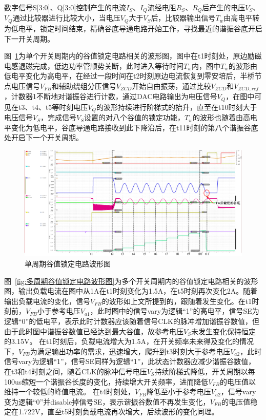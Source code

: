 数字信号S[3:0]、Q[3:0]控制产生的电流$I_S$、$I_Q$流经电阻$R_S$、$R_Q$后产生的电压$V_S$、$V_Q$通过比较器进行比较大小，当电压$V_Q$大于$V_S$后，比较器输出信号$T_w$由高电平转为低电平，锁定时间结束，精确谷底导通电路开始工作，寻找最近的谐振谷底开启下一开关周期。

图~\ref{fig:单周期谷值锁定电路波形图}为单个开关周期内的谷值锁定电路相关的波形图，图中在t1时刻处，原边励磁电感退磁完成，低边功率管顺势关断，此时进入等待时间$T_w$内，图中$T_w$的波形由低电平变化为高电平，在经过一段时间在t2时刻原边电流恢复到零安培后，半桥节点电压信号$V_{FB}$和辅助绕组分压信号$V_{ZCD}$开始自由振荡，通过比较$V_{ZCD}$和$V_{ZCD,ref}$，计数器1不断地对谐振谷进行计数，通过DAC电路输出为电压信号$V_{Q}$，在图中可见在t3、t4、t5等时刻电压$V_{Q}$的波形持续进行阶梯式的抬升，直至在t10时刻大于电压信号$V_{S}$，完成信号$V_{S}$设置的对八个谷值的锁定功能，$T_w$的波形也随着由高电平变化为低电平，谷底导通电路接收到此下降沿后，在t11时刻的第八个谐振谷底处开启下一个开关周期。

\begin{figure}[htbp] 
    \centering
    \includegraphics[width=0.8\linewidth]{figures/valley_lock.pdf}
    \caption{单周期谷值锁定电路波形图}
    \label{fig:单周期谷值锁定电路波形图}
\end{figure} 

图~\ref{fig:多周期谷值锁定电路波形图}为多个开关周期内的谷值锁定电路相关的波形图，输出负载电流在图中从1A在t1时刻变化为1.5A，在t5时刻再次变化2A。随着输出负载电流的变化，信号$V_{FB}$的波形如上文所提到的，跟随着发生变化。在t1时刻前，$V_{FB}$小于参考电压$V_{a1}$，此时图中的信号vary为逻辑“1”的高电平，信号SE为逻辑“0”的低电平，表示此时计数器应该随着信号CLK的脉冲增加谐振谷数值，但由于此时图中谐振谷数值已经达到最大谷值，故参考电压$V_S$未发生变化保持恒定的3.15V。
在t1时刻后，负载电流增大为1.5A，在开关频率未来得及变化的情况下，$V_{FB}$为满足输出功率的需求，迅速增大，爬升到t3时刻大于参考电压$V_{a2}$，此时信号vary为逻辑“1”，信号SE同样为逻辑“1”，此状态计数器应减少谐振谷数值，在t3和t4时刻之间，随着CLK的脉冲信号电压$V_S$持续阶梯式降低，开关周期以每100us缩短一个谐振谷长度的变化，持续增大开关频率，进而降低$V_{FB}$的电压值以维持一个较低的峰值电流。
在t4时刻处，$V_{FB}$降低至小于参考电压$V_{a2}$，信号vary变为逻辑“0”并disable掉信号SE，表示谐振谷数值不再发生变化，$V_{FB}$的电压值稳定在1.722V，直至t5时刻负载电流再次增大，后续波形的变化同理。

